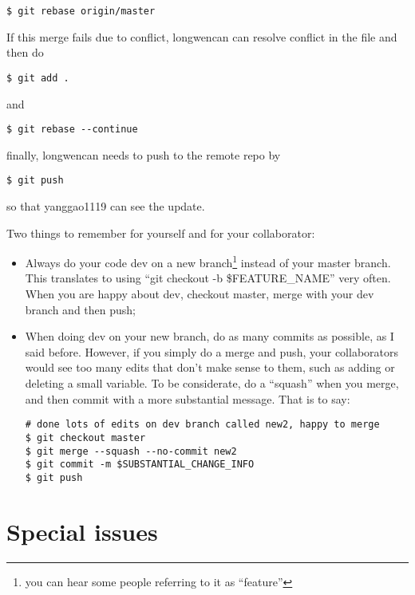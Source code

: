 \documentclass{article} %
\newcommand{\q}[1]{``#1''}
\begin{document}
\begin{lstlisting}
$ git rebase origin/master
\end{lstlisting}

If this merge fails due to conflict, longwencan can resolve conflict in the file and then do 

\begin{lstlisting}
$ git add .
\end{lstlisting}

and 

\begin{lstlisting}
$ git rebase --continue
\end{lstlisting}

finally, longwencan needs to push to the remote repo by

\begin{lstlisting}
$ git push
\end{lstlisting}

so that yanggao1119 can see the update.

Two things to remember for yourself and for your collaborator:

\begin{itemize}
\item Always do your code dev on a new branch\footnote{you can hear some people referring to it as \q{feature} } instead of your master branch. This translates to using \q{git checkout -b \$FEATURE\_NAME} very often. When you are happy about dev, checkout master, merge with your dev branch and then push;
\item When doing dev on your new branch, do as many commits as possible, as I said before. However, if you simply do a merge and push, your collaborators would see too many edits that don't make sense to them, such as adding or deleting a small variable. To be considerate, do a \q{squash} when you merge, and then commit with a more substantial message. That is to say:

\begin{lstlisting}
# done lots of edits on dev branch called new2, happy to merge
$ git checkout master
$ git merge --squash --no-commit new2
$ git commit -m $SUBSTANTIAL_CHANGE_INFO
$ git push
\end{lstlisting}

\end{itemize}


\section{Special issues}
\end{document}
